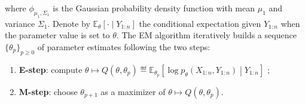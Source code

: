 where $\phi_{\mu_1,\Sigma_1}$ is the Gaussian probability density function with mean $\mu_1$ and variance $\Sigma_1$.
Denote by $\mathbb{E}_{\theta}\left[\cdot\middle|Y_{1:n}\right]$  the conditional expectation given $Y_{1:n}$ when the parameter value is set to $\theta$. The EM algorithm iteratively builds a sequence $\{\theta_{p}\}_{p\ge 0}$ of parameter estimates following the two steps:
\begin{enumerate}
	\item {\bf E-step}: compute $\theta \mapsto Q(\theta,\theta_{p})\eqdef \mathbb{E}_{\theta_p}\left[\log p_{\theta}(X_{1:n},Y_{1:n})\middle|Y_{1:n}\right]$ ;
	\item {\bf M-step}: choose $\theta_{p+1}$ as a maximizer of $\theta \mapsto Q(\theta,\theta_{p})$.
\end{enumerate}
